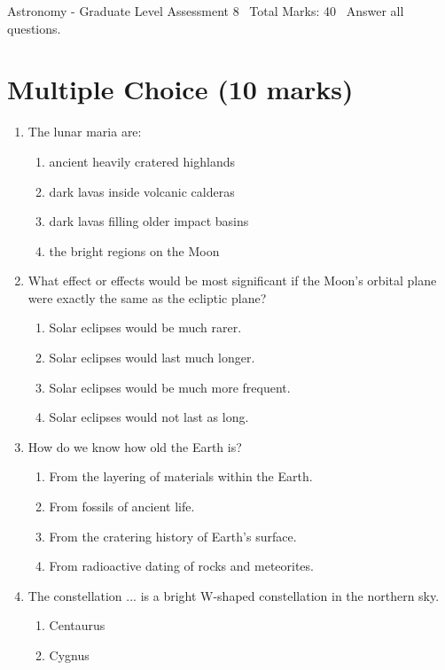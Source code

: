 \documentclass[12pt]{article}
\begin{document}
\begin{center}
Astronomy - Graduate Level Assessment 8 \
Total Marks: 40 \
Answer all questions.
\end{center}

\section*{Multiple Choice (10 marks)}
\begin{enumerate}[label=\arabic*.]
\item The lunar maria are:
\begin{enumerate}[label=(\alph*)]
    \item ancient heavily cratered highlands
    \item dark lavas inside volcanic calderas
    \item dark lavas filling older impact basins
    \item the bright regions on the Moon
\end{enumerate}
\item What effect or effects would be most significant if the Moon's orbital plane were exactly the same as the ecliptic plane?
\begin{enumerate}[label=(\alph*)]
    \item Solar eclipses would be much rarer.
    \item Solar eclipses would last much longer.
    \item Solar eclipses would be much more frequent.
    \item Solar eclipses would not last as long.
\end{enumerate}
\item How do we know how old the Earth is?
\begin{enumerate}[label=(\alph*)]
    \item From the layering of materials within the Earth.
    \item From fossils of ancient life.
    \item From the cratering history of Earth's surface.
    \item From radioactive dating of rocks and meteorites.
\end{enumerate}
\item The constellation ... is a bright W-shaped constellation in the northern sky.
\begin{enumerate}[label=(\alph*)]
    \item Centaurus
    \item Cygnus

\end{enumerate}
\end{enumerate}
\end{document}
